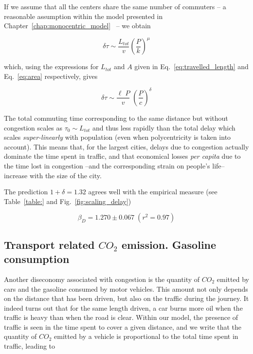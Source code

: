 If we assume that all the centers share the same number of commuters -- a
reasonable assumption within the model presented in
Chapter~\ref{chap:monocentric_model}~\cite{Louf:2013_polycentric} -- we obtain

\begin{equation} 
    \delta \tau \sim \frac{L_{tot}}{v} \left( \frac{P}{k}
\right)^{\mu} 
\end{equation} 

which, using the expressions for $L_{tot}$ and $A$
given in Eq.~\ref{eq:travelled_length} and Eq.~\ref{eq:area} respectively, gives

\begin{equation} 
    \delta \tau \sim \frac{\ell\; P}{v}\;\left(\frac{P}{c}\right)^{\delta} 
\end{equation}

The total commuting time corresponding to the same distance but without
congestion scales as $\tau_0\sim L_{tot}$ and thus less rapidly than the total
delay which scales \emph{super-linearly} with population (even when
polycentricity is taken into account). This means that, for the largest cities,
delays due to congestion actually dominate the time spent in traffic, and that
economical losses \emph{per capita} due to the time lost in congestion --and the
corresponding strain on people's life-- increase with the size of the city. 

The prediction $1+\delta = 1.32$ agrees well with the empirical measure (see
Table~\ref{table:} and Fig.~\ref{fig:scaling_delay})

\begin{equation}
    \boxed{\beta_D = 1.270 \pm 0.067\;(r^2 = 0.97)}
\end{equation}

\subsection{Transport related $CO_2$ emission. Gasoline consumption}

Another diseconomy associated with congestion is the quantity of $CO_2$ emitted
by cars and the gasoline consumed by motor vehicles. This amount not only
depends on the distance that has been driven, but also on the traffic during the
journey. It indeed turns out that for the same length driven, a car burns more
oil when the traffic is heavy than when the road is clear.  Within our model,
the presence of traffic is seen in the time spent to cover a given distance, and
we write that the quantity of $CO_2$ emitted by a vehicle is proportional to the
total time spent in traffic, leading to

